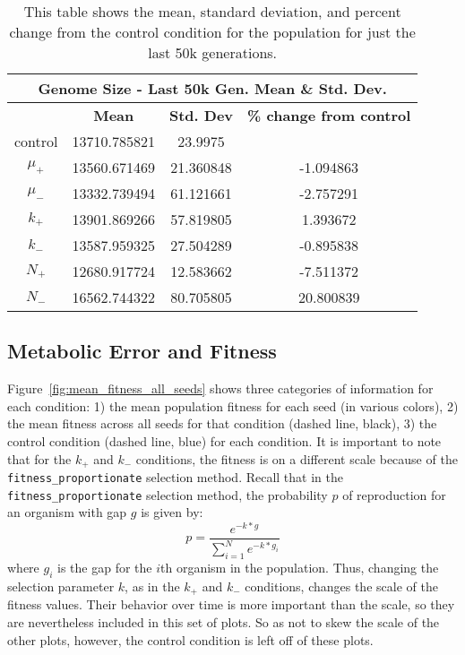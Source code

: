 \begin{table}[H]
	\begin{tabular}{|c|c|c|c|}
		\hline
		\multicolumn{4}{c}{\textbf{Genome Size - Last 50k Gen. Mean \& Std. Dev.}} \\
		\hline
		& \textbf{Mean} & \textbf{Std. Dev} & \textbf{\% change from control} \\
		\hline
		control & 13710.785821 & 23.9975 & \textemdash \\ 
		\hline
		$\mu_+$ & 13560.671469 & 21.360848 & -1.094863 \\ 
		\hline
		$\mu_-$ & 13332.739494 & 61.121661 & -2.757291 \\ 
		\hline
		$k_+$ & 13901.869266 & 57.819805 & 1.393672 \\ 
		\hline
		$k_-$ & 13587.959325 & 27.504289 & -0.895838 \\ 
		\hline
		$N_+$ & 12680.917724 & 12.583662 & -7.511372 \\ 
		\hline
		$N_-$ & 16562.744322 & 80.705805 & 20.800839 \\ 
		\hline
	\end{tabular}
	\caption[Genome size - last 50k generations mean \& std. dev.]{This table shows the mean, standard deviation, and percent change from the control condition for the population for just the last 50k generations.}
	\label{table:genome_size_stats_last_50k}
\end{table}


\subsection{Metabolic Error and Fitness}\label{res:metabolic_error_and_fitness}
Figure~\ref{fig:mean_fitness_all_seeds} shows three categories of information for each condition: 1) the mean population fitness for each seed (in various colors), 2) the mean fitness across all seeds for that condition (dashed line, black), 3) the control condition (dashed line, blue) for each condition. It is important to note that for the $k_+$ and $k_-$ conditions, the fitness is on a different scale because of the \texttt{fitness\_proportionate} selection method. Recall that in the \texttt{fitness\_proportionate} selection method, the probability $p$ of reproduction for an organism with gap $g$ is given by:
\begin{equation*}
p = \frac{e^{-k*g}}{\sum_{i=1}^{N}e^{-k*g_i}}
\end{equation*}
where $g_i$ is the gap for the $i$th organism in the population. Thus, changing the selection parameter $k$, as in the $k_+$ and $k_-$ conditions, changes the scale of the fitness values. Their behavior over time is more important than the scale, so they are nevertheless included in this set of plots. So as not to skew the scale of the other plots, however, the control condition is left off of these plots. 

